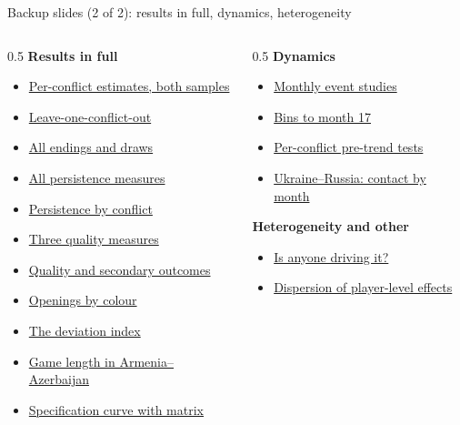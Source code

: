 \documentclass[aspectratio=169,11pt,t]{beamer}
\begin{document}
\begin{frame}[label=backup-index2]{Backup slides (2 of 2): results in full, dynamics, heterogeneity}
  \footnotesize
  \begin{columns}[T]
    \begin{column}{0.5\textwidth}
      \textbf{Results in full}
      \begin{itemize}
        \item \hyperlink{bk-forest-full}{Per-conflict estimates, both samples}
        \item \hyperlink{bk-loo}{Leave-one-conflict-out}
        \item \hyperlink{bk-composition-full}{All endings and draws}
        \item \hyperlink{bk-persistence-full}{All persistence measures}
        \item \hyperlink{bk-persistconflict}{Persistence by conflict}
        \item \hyperlink{bk-quality-full}{Three quality measures}
        \item \hyperlink{bk-secondary}{Quality and secondary outcomes}
        \item \hyperlink{bk-openings-full}{Openings by colour}
        \item \hyperlink{bk-openings}{The deviation index}
        \item \hyperlink{bk-aalength}{Game length in Armenia--Azerbaijan}
        \item \hyperlink{bk-speccurve-full}{Specification curve with matrix}
      \end{itemize}
    \end{column}
    \begin{column}{0.5\textwidth}
      \textbf{Dynamics}
      \begin{itemize}
        \item \hyperlink{bk-monthly}{Monthly event studies}
        \item \hyperlink{bk-fullwindow}{Bins to month 17}
        \item \hyperlink{bk-pretrends}{Per-conflict pre-trend tests}
        \item \hyperlink{bk-contact}{Ukraine--Russia: contact by month}
      \end{itemize}
      \textbf{Heterogeneity and other}
      \begin{itemize}
        \item \hyperlink{anyone}{Is anyone driving it?}
        \item \hyperlink{bk-dispersion}{Dispersion of player-level effects}

\end{itemize}
\end{column}
\end{columns}
\end{frame}
\end{document}
